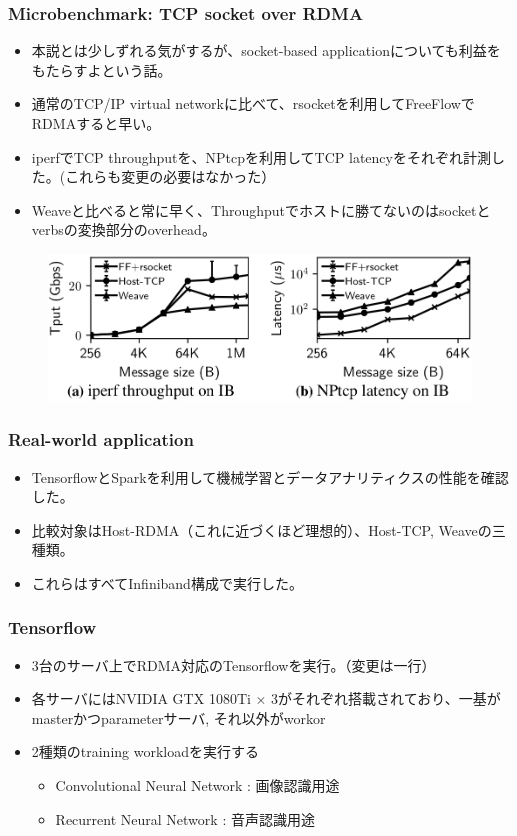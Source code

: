 \documentclass[dvipdfmx,9pt,notheorems]{beamer}
\theoremstyle{definition}
\begin{document}
\begin{frame}\frametitle{Microbenchmark: TCP socket over RDMA}
	\begin{itemize}
		\item 本説とは少しずれる気がするが、socket-based applicationについても利益をもたらすよという話。
		\item 通常のTCP/IP virtual networkに比べて、rsocketを利用してFreeFlowでRDMAすると早い。
		\item iperfでTCP throughputを、NPtcpを利用してTCP latencyをそれぞれ計測した。({\color{orange}これらも変更の必要はなかった}）
		\item Weaveと比べると常に早く、Throughputでホストに勝てないのはsocketとverbsの変換部分のoverhead。
	\end{itemize}
  \begin{figure}[htb]
    \centering
		\includegraphics[scale=1]{fig/figure14.png}
  \end{figure}
\end{frame}


\begin{frame}\frametitle{Real-world application}
	\begin{itemize}
		\item TensorflowとSparkを利用して機械学習とデータアナリティクスの性能を確認した。
		\item 比較対象はHost-RDMA（これに近づくほど理想的）、Host-TCP, Weaveの三種類。
		\item これらはすべてInfiniband構成で実行した。
	\end{itemize}
\end{frame}

\begin{frame}\frametitle{Tensorflow}
	\begin{itemize}
		\item 3台のサーバ上でRDMA対応のTensorflowを実行。（{\color{orange}変更は一行}）
		\item 各サーバにはNVIDIA GTX 1080Ti $\times$ 3がそれぞれ搭載されており、一基がmasterかつparameterサーバ, それ以外がworkor
		\item 2種類のtraining workloadを実行する
		\begin{itemize}
			\item Convolutional Neural Network : 画像認識用途
			\item Recurrent Neural Network : 音声認識用途
		\end{itemize}
	\end{itemize}
\end{frame}
\end{document}
